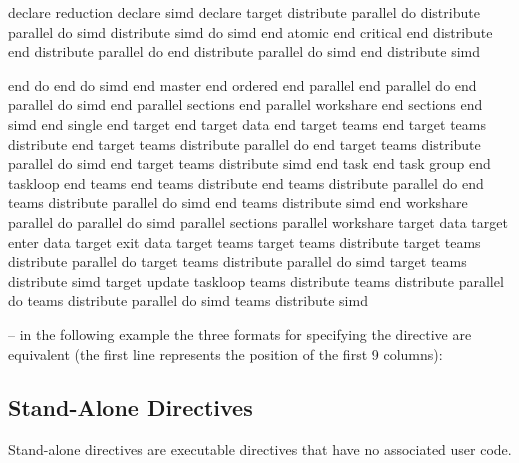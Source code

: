 \begin{indentedcodelist}
declare reduction
declare simd
declare target
distribute parallel do
distribute parallel do simd
distribute simd
do simd
end atomic
end critical
end distribute 
end distribute parallel do
end distribute parallel do simd
end distribute simd
\end{indentedcodelist}
\pagebreak
\begin{figure}[t!]
\end{figure}
\begin{indentedcodelist}
end do
end do simd
end master
end ordered
end parallel
end parallel do
end parallel do simd
end parallel sections
end parallel workshare
end sections
end simd
end single
end target
end target data
end target teams
end target teams distribute
end target teams distribute parallel do
end target teams distribute parallel do simd
end target teams distribute simd
end task
end task group
end taskloop
end teams
end teams distribute
end teams distribute parallel do
end teams distribute parallel do simd
end teams distribute simd
end workshare
parallel do
parallel do simd
parallel sections
parallel workshare
target data
target enter data
target exit data
target teams
target teams distribute
target teams distribute parallel do
target teams distribute parallel do simd
target teams distribute simd
target update
taskloop
teams distribute
teams distribute parallel do
teams distribute parallel do simd
teams distribute simd
\end{indentedcodelist}

\notestart
\noteheader – in the following example the three formats for specifying the directive are 
equivalent (the first line represents the position of the first 9 columns):

\begin{alltt}
\end{alltt}
\noteend
\bigskip
\fortranspecificend








\subsection{Stand-Alone Directives}
\label{subsec:Stand-Alone Directives}
\summary
Stand-alone directives are executable directives that have no associated user code.

